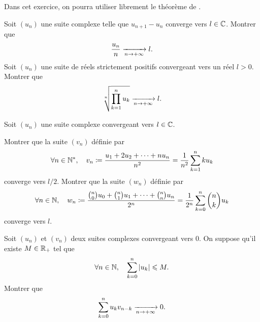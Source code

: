 \documentclass{magnolia}
\begin{document}
Dans cet exercice, on pourra utiliser librement le théorème de .
\begin{questions}
\question Soit $(u_n)$ une suite complexe telle que $u_{n+1}-u_n$ converge vers
    $l\in\mathbb{C}$. Montrer que
    \[\frac{u_n}{n} \xrightarrow[n\rightarrow +\infty]{} l.\]
\question Soit $(u_n)$ une suite de réels strictement positifs convergeant vers
    un réel $l>0$. Montrer que
    \[\sqrt[n]{\prod_{k=1}^{n} u_k}  \xrightarrow[n\rightarrow +\infty]{} l.\]
\end{questions}


Soit $(u_n)$ une suite complexe convergeant vers $l\in\mathbb{C}$. 
\begin{questions}
\question Montrer que la suite $(v_n)$ définie par
  \[\forall n\in{\mathbb{N}^*} ,\quad v_n\coloneqq\frac{u_1+2u_2+\dots+nu_n}{n^2}=
    \frac{1}{n^2} \sum_{k=1}^{n} k u_k\]
  converge vers $l/2$.
\question Montrer que la suite $(w_n)$ définie par 
  \[\forall n\in\mathbb{N} ,\quad w_n\coloneqq\frac{\binom{n}{0}u_0+ \binom{n}{1}u_1+
    \dots+\binom{n}{n}u_n}{2^n}=\frac{1}{2^n} \sum_{k=0}^{n}
    \binom{n}{k} u_k\]
  converge vers $l$.
\end{questions}


Soit $(u_n)$ et $(v_n)$ deux suites complexes convergeant vers 0. On suppose qu'il existe
$M\in\mathbb{R}_+$ tel que
\[\forall n\in\mathbb{N},\quad \sum_{k=0}^n \left|u_k\right|\leqslant M.\]
Montrer que
\[\sum_{k=0}^n u_k v_{n-k} \xrightarrow[n\rightarrow +\infty]{}0.\]


\end{document}
